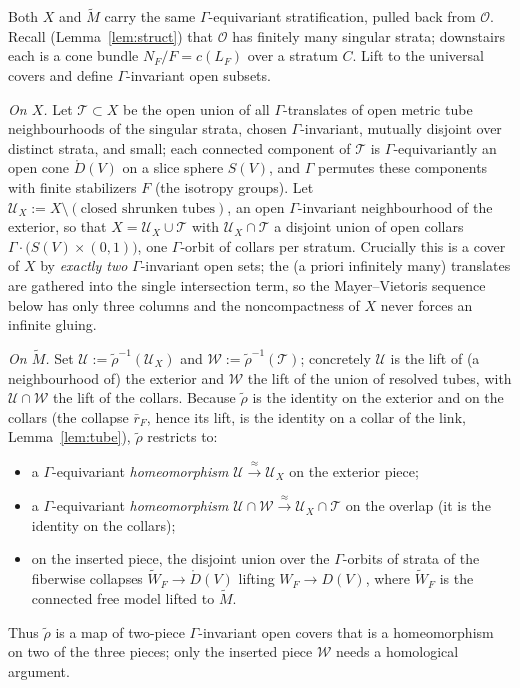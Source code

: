 \documentclass[12pt]{article}
\theoremstyle{definition}
\begin{document}
Both $X$ and $\widetilde M$ carry the same $\Gamma$-equivariant stratification,
pulled back from $\mathcal O$. Recall (Lemma~\ref{lem:struct}) that
$\mathcal O$ has finitely many singular strata; downstairs each is a cone bundle
$N_F/F=c(L_F)$ over a stratum $C$. Lift to the universal covers and define
$\Gamma$-invariant open subsets.

\emph{On $X$.} Let $\mathcal{T}\subset X$ be the open union of all
$\Gamma$-translates of open metric tube neighbourhoods of the singular strata,
chosen $\Gamma$-invariant, mutually disjoint over distinct strata, and small;
each connected component of $\mathcal T$ is $\Gamma$-equivariantly an open cone
$\mathring D(V)$ on a slice sphere $S(V)$, and $\Gamma$ permutes these components
with finite stabilizers $F$ (the isotropy groups). Let
$\mathcal U_X:=X\setminus(\text{closed shrunken tubes})$, an open
$\Gamma$-invariant neighbourhood of the exterior, so that
$X=\mathcal U_X\cup\mathcal T$ with $\mathcal U_X\cap\mathcal T$ a disjoint union
of open collars $\Gamma\!\cdot\!\big(S(V)\times(0,1)\big)$, one $\Gamma$-orbit of
collars per stratum. Crucially this is a cover of $X$ by \emph{exactly two}
$\Gamma$-invariant open sets; the (a priori infinitely many) translates are
gathered into the single intersection term, so the Mayer--Vietoris sequence below
has only three columns and the noncompactness of $X$ never forces an infinite
gluing.

\emph{On $\widetilde M$.} Set $\mathcal U:=\widetilde\rho^{-1}(\mathcal U_X)$ and
$\mathcal W:=\widetilde\rho^{-1}(\mathcal T)$; concretely $\mathcal U$ is the lift
of (a neighbourhood of) the exterior and $\mathcal W$ the lift of the union of
resolved tubes, with $\mathcal U\cap\mathcal W$ the lift of the collars. Because
$\widetilde\rho$ is the identity on the exterior and on the collars (the collapse
$\bar r_F$, hence its lift, is the identity on a collar of the link,
Lemma~\ref{lem:tube}), $\widetilde\rho$ restricts to:
\begin{itemize}
\item a $\Gamma$-equivariant \emph{homeomorphism}
$\mathcal U\xrightarrow{\ \approx\ }\mathcal U_X$ on the exterior piece;
\item a $\Gamma$-equivariant \emph{homeomorphism}
$\mathcal U\cap\mathcal W\xrightarrow{\ \approx\ }\mathcal U_X\cap\mathcal T$ on
the overlap (it is the identity on the collars);
\item on the inserted piece, the disjoint union over the $\Gamma$-orbits of strata
of the fiberwise collapses $\widetilde W_F\to \mathring D(V)$ lifting
$W_F\to D(V)$, where $\widetilde W_F$ is the connected free model lifted to
$\widetilde M$.
\end{itemize}
Thus $\widetilde\rho$ is a map of two-piece $\Gamma$-invariant open covers that is
a homeomorphism on two of the three pieces; only the inserted piece $\mathcal W$
needs a homological argument.
\end{document}
